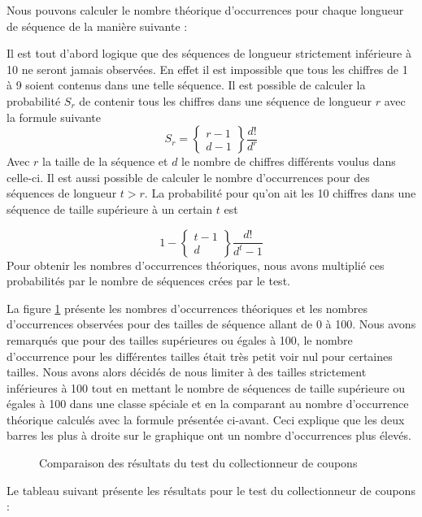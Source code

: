 \documentclass[10pt,a4paper]{article}
\begin{document}
Nous pouvons calculer le nombre théorique d'occurrences pour chaque longueur de séquence de la manière suivante :

Il est tout d'abord logique que des séquences de longueur strictement inférieure à 10 ne seront jamais observées. En effet il est impossible que tous les chiffres de 1 à 9 soient contenus dans une telle séquence. \newline
Il est possible de calculer la probabilité $S_r$ de contenir tous les chiffres dans une séquence de longueur $r$ avec la formule suivante
\begin{equation*}
S_r = 
\begin{Bmatrix}
r-1\\
d-1
\end{Bmatrix}
\frac{d!}{d^r}
\end{equation*}
Avec $r$ la taille de la séquence et $d$ le nombre de chiffres différents voulus dans celle-ci.\newline
Il est aussi possible de calculer le nombre d'occurrences pour des séquences de longueur $t>r$. La probabilité pour qu'on ait les 10 chiffres dans une séquence de taille supérieure à un certain $t$ est 

\begin{equation*}
1- 
\begin{Bmatrix}
t-1\\
d
\end{Bmatrix}
\frac{d!}{d^t-1}
\end{equation*}
Pour obtenir les nombres d'occurrences théoriques, nous avons multiplié ces probabilités par le nombre de séquences crées par le test.\newline
 
La figure \ref{couponshisto} présente les nombres d'occurrences théoriques et les nombres d'occurrences observées pour des tailles de séquence allant de 0 à 100. Nous avons remarqués que pour des tailles supérieures ou égales à 100, le nombre d'occurrence pour les différentes tailles était très petit voir nul pour certaines tailles. Nous avons alors décidés de nous limiter à des tailles strictement inférieures à 100 tout en mettant le nombre de séquences de taille supérieure ou égales à 100 dans une classe spéciale et en la comparant au nombre d'occurrence théorique calculés avec la formule présentée ci-avant. Ceci explique que les deux barres les plus à droite sur le graphique ont un nombre d'occurrences plus élevés.
\begin{figure}[H]
\caption{Comparaison des résultats du test du collectionneur de coupons}
\label{couponshisto}
\end{figure}
Le tableau suivant présente les résultats pour le test du collectionneur de coupons : 
\end{document}
